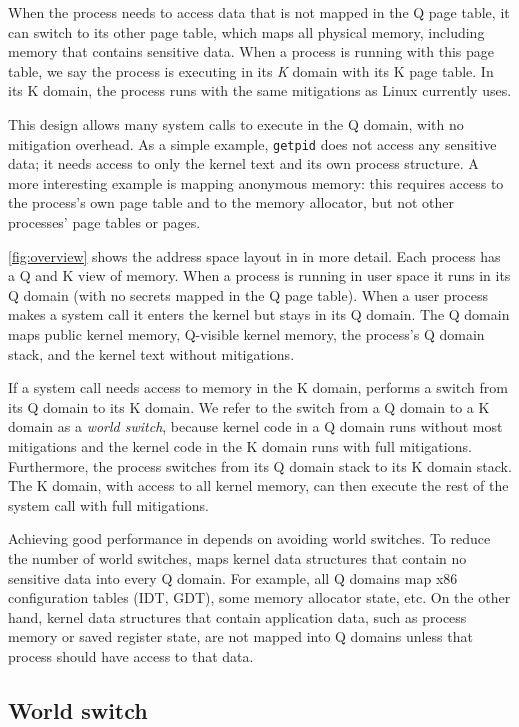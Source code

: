 When the process needs to access data that is not mapped in the Q page
table, it can switch to its other page table, which maps all physical
memory, including memory that contains sensitive data.  When a process
is running with this page table, we say the process is executing in
its \textit{K} domain with its K page table.  In its K domain, the process
runs with the same mitigations as Linux currently uses.

This design allows many system calls to execute in the Q domain,
with no mitigation overhead.  As a simple example,
\texttt{getpid} does not access any sensitive data; it needs
access to only the kernel text and its own process structure.  A more
interesting example is mapping anonymous memory: this requires access
to the process's own page table and to the memory allocator, but not
other processes' page tables or pages.

\autoref{fig:overview} shows the address space layout in \sys in more
detail.  Each process has a Q and K view of memory.  When a process is
running in user space it runs in its Q domain (with no secrets mapped
in the Q page table).  When a user process makes a system call it
enters the kernel but stays in its Q domain.  The Q domain maps public
kernel memory, Q-visible kernel memory, the process's Q domain stack,
and the kernel text without mitigations.

If a system call needs access to memory in the K domain, \sys performs a
switch from its Q domain to its K domain. We refer to the switch from a Q
domain to a K domain as a \textit{world switch}, because kernel code in
a Q domain runs without most mitigations and the kernel code in the K domain
runs with full mitigations. Furthermore, the process switches from its
Q domain stack to its K domain stack.  The K domain, with access to
all kernel memory, can then execute the rest of the system call with
full mitigations.

Achieving good performance in \sys depends on avoiding world switches.
To reduce the number of world switches, \sys maps kernel data
structures that contain no sensitive data into every Q domain.  For
example, all Q domains map x86 configuration tables (IDT, GDT), some
memory allocator state, etc.  On the other hand, kernel data structures
that contain application data, such as process memory or saved register
state, are not mapped into Q domains unless that process should have
access to that data.

\subsection{World switch}
\label{ss:switch}

